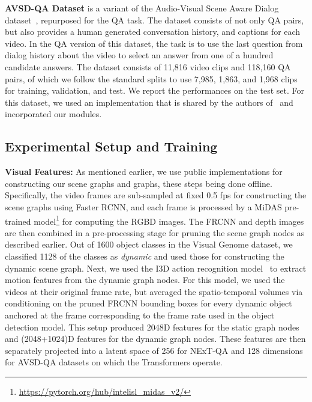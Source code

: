 \documentclass[letterpaper]{article} %
\begin{document}
\noindent\textbf{AVSD-QA Dataset} is a variant of the Audio-Visual Scene Aware Dialog dataset~\cite{AVSD@DSTC7}, repurposed for the QA task. The dataset consists of not only QA pairs, but also provides a human generated conversation history, and  captions for each video. In the QA version of this dataset, the task is to use the last question from dialog history about the video to select an answer from one of a hundred candidate answers. The dataset consists of 11,816 video clips and 118,160 QA pairs, of which we follow the standard splits to use 7,985, 1,863, and 1,968 clips for training, validation, and test. We report the performances on the test set. For this dataset, we used an implementation that is shared by the authors of~\cite{geng2021dynamic} and incorporated our modules.

\subsection{Experimental Setup and Training}
\noindent\textbf{Visual Features:} As mentioned earlier, we use public implementations for constructing our scene graphs and \name graphs, these steps being done offline. Specifically, the video frames are sub-sampled at fixed 0.5 fps for constructing the scene graphs using Faster RCNN, and each frame is processed by a MiDAS pre-trained model\footnote{\url{https://pytorch.org/hub/intelisl_midas_v2/}} for computing the RGBD images. The FRCNN and depth images are then combined in a pre-processing stage for pruning the scene graph nodes as described earlier. Out of 1600 object classes in the Visual Genome dataset, we classified 1128 of the classes as \emph{dynamic} and used those for constructing the dynamic scene graph. Next, we used the I3D action recognition model~\cite{carreira2017quo} to extract motion features from the dynamic graph nodes. For this model, we used the videos at their original frame rate, but averaged the spatio-temporal volumes via conditioning on the pruned FRCNN bounding boxes for every dynamic object anchored at the frame corresponding to the frame rate used in the object detection model. This setup produced 2048D features for the static graph nodes and (2048+1024)D features for the dynamic graph nodes. These features are then separately projected into a latent space of 256 for NExT-QA and 128 dimensions for AVSD-QA datasets on which the Transformers operate.
\end{document}
